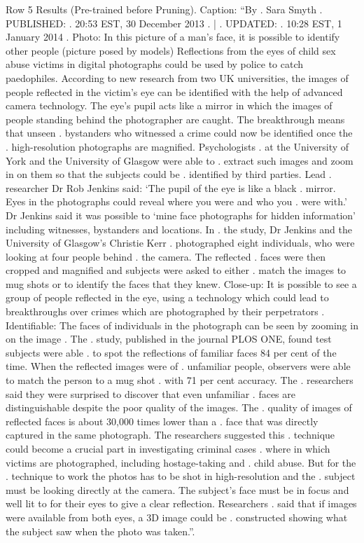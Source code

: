 \begin{table}[H]
\centering
\caption{Row 5 Results (Pre-trained before Pruning). \ifshowcaption{}Caption: ``By . Sara Smyth . PUBLISHED: . 20:53 EST, 30 December 2013 . | . UPDATED: . 10:28 EST, 1 January 2014 . Photo: In this picture of a man's face, it is possible to identify other people (picture posed by models) Reflections from the eyes of child sex abuse victims in digital photographs could be used by police to catch paedophiles. According to new research from two UK universities, the images of people reflected in the victim's eye can be identified with the help of advanced camera technology. The eye's pupil acts like a mirror in which the images of people standing behind the photographer are caught. The breakthrough means that unseen . bystanders who witnessed a crime could now be identified once the . high-resolution photographs are magnified. Psychologists . at the University of York and the University of Glasgow were able to . extract such images and zoom in on them so that the subjects could be . identified by third parties. Lead . researcher Dr Rob Jenkins said: ‘The pupil of the eye is like a black . mirror. Eyes in the photographs could reveal where you were and who you . were with.' Dr Jenkins said it was possible to ‘mine face photographs for hidden information' including witnesses, bystanders and locations. In . the study, Dr Jenkins and the University of Glasgow's Christie Kerr . photographed eight individuals, who were looking at four people behind . the camera. The reflected . faces were then cropped and magnified and subjects were asked to either . match the images to mug shots or to identify the faces that they knew. Close-up: It is possible to see a group of people reflected in the eye, using a technology which could lead to breakthroughs over crimes which are photographed by their perpetrators . Identifiable: The faces of individuals in the photograph can be seen by zooming in on the image . The . study, published in the journal PLOS ONE, found test subjects were able . to spot the reflections of familiar faces 84 per cent of the time. When the reflected images were of . unfamiliar people, observers were able to match the person to a mug shot . with 71 per cent accuracy. The . researchers said they were surprised to discover that even unfamiliar . faces are distinguishable despite the poor quality of the images. The . quality of images of reflected faces is about 30,000 times lower than a . face that was directly captured in the same photograph. The researchers suggested this . technique could become a crucial part in investigating criminal cases . where in which victims are photographed, including hostage-taking and . child abuse. But for the . technique to work the photos has to be shot in high-resolution and the . subject must be looking directly at the camera. The subject's face must be in focus and well lit to for their eyes to give a clear reflection. Researchers . said that if images were available from both eyes, a 3D image could be . constructed showing what the subject saw when the photo was taken.''.\fi}

\end{table}
